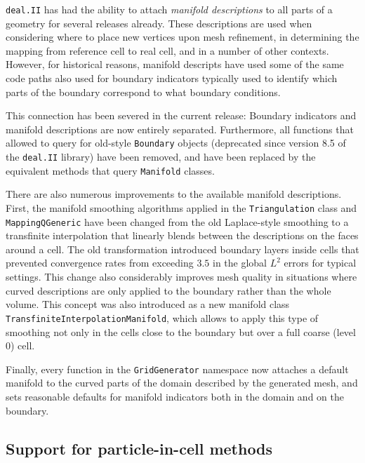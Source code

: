 \documentclass{ansarticle-preprint}
\newcommand{\specialword}[1]{\texttt{#1}}
\newcommand{\dealii}{{\specialword{deal.II}}\xspace}
\begin{document}

\dealii{} has had the ability to attach \textit{manifold descriptions}
to all parts of a geometry for several releases already. These
descriptions are used when considering where to place new vertices
upon mesh refinement, in determining the mapping from reference cell
to real cell, and in a number of other contexts. However, for historical
reasons, manifold descripts have used some of the same code paths also
used for boundary indicators typically used to identify which parts of
the boundary correspond to what boundary conditions.

This connection has been severed in the current release: Boundary
indicators and manifold descriptions are now entirely separated. Furthermore,
all functions that allowed to query for old-style \texttt{Boundary} objects (deprecated
since version 8.5 of the \dealii library) have been removed, and have been
replaced by the equivalent methods that query \texttt{Manifold} classes.

There are also numerous improvements to the available manifold descriptions.
First, the manifold smoothing algorithms applied in the \texttt{Triangulation} class and
\texttt{MappingQGeneric} have been changed from the old Laplace-style smoothing to a
transfinite interpolation that linearly blends between the descriptions on the
faces around a cell. The old transformation introduced boundary layers inside
cells that prevented convergence rates from exceeding \(3.5\) in the global
\(L^2\) errors for typical settings. This change also considerably improves mesh
quality in situations where curved descriptions are only applied to the boundary
rather than the whole volume. This concept was also introduced as a new manifold class
\texttt{TransfiniteInterpolationManifold}, which allows to apply this type of smoothing not only in the cells close to the boundary but over a full coarse (level 0) cell.

Finally,
every function in the \texttt{GridGenerator} namespace now attaches a default manifold to
the curved parts of the domain described by the generated mesh, and sets reasonable defaults for manifold
indicators both in the domain and on the boundary.



\subsection{Support for particle-in-cell methods}
\end{document}

